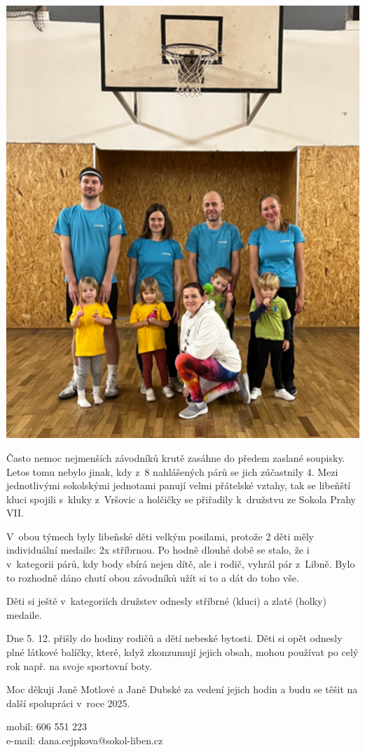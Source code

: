 \documentclass[11pt]{article}
\begin{document}
\begin{center}
  \includegraphics*[width=0.7\linewidth]{./RD_zavody.jpg}
\end{center}

Často nemoc nejmenších závodníků krutě zasáhne do předem zaslané soupisky. Letos tomu nebylo jinak, kdy z~8 nahlášených párů se jich zúčastnily 4. Mezi jednotlivými sokolskými jednotami panují velmi přátelské vztahy, tak se libeňští kluci spojili s~kluky z~Vršovic a holčičky se přiřadily k~družstvu ze Sokola Prahy VII.

V~obou týmech byly libeňské děti velkým posilami, protože 2 děti měly individuální medaile: 2x stříbrnou. Po hodně dlouhé době se stalo, že i v~kategorii párů, kdy body sbírá nejen dítě, ale i rodič, vyhrál pár z~Libně. Bylo to rozhodně dáno chutí obou závodníků užít si to a dát do toho vše.

Děti si ještě v~kategoriích družstev odnesly stříbrné (kluci) a zlaté (holky) medaile.

Dne 5. 12. přišly do hodiny rodičů a dětí nebeské bytosti. Děti si opět odnesly plné látkové balíčky, které, když zkonzumují jejich obsah, mohou používat po celý rok např. na svoje sportovní boty.

Moc děkuji Janě Motlové a Janě Dubské za vedení jejich hodin a budu se těšit na další spolupráci v~roce 2025.


\signature{Dana Cejpková}{mobil: 606 551 223\\e-mail: dana.cejpkova@sokol-liben.cz}
\end{document}
